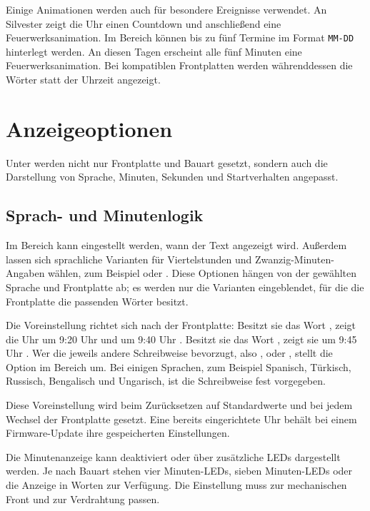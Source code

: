 \documentclass[12pt,a4paper, german,oneside, headinclude, headsepline,plainheadsepline,BCOR20mm, DIV18,parskip=half, openright, numbers=noenddot, captions=tableheading,version=first,listof=totoc,version=first]{scrbook}
\begin{document}
Einige Animationen werden auch für besondere Ereignisse verwendet. An Silvester zeigt die Uhr einen Countdown und anschließend eine Feuerwerksanimation. Im Bereich  können bis zu fünf Termine im Format \texttt{MM-DD} hinterlegt werden. An diesen Tagen erscheint alle fünf Minuten eine Feuerwerksanimation. Bei kompatiblen Frontplatten werden währenddessen die Wörter  statt der Uhrzeit angezeigt.

\section{Anzeigeoptionen}

Unter  werden nicht nur Frontplatte und Bauart gesetzt, sondern auch die Darstellung von Sprache, Minuten, Sekunden und Startverhalten angepasst.

\subsection{Sprach- und Minutenlogik}

Im Bereich  kann eingestellt werden, wann der Text  angezeigt wird. Außerdem lassen sich sprachliche Varianten für Viertelstunden und Zwanzig-Minuten-Angaben wählen, zum Beispiel  oder . Diese Optionen hängen von der gewählten Sprache und Frontplatte ab; es werden nur die Varianten eingeblendet, für die die Frontplatte die passenden Wörter besitzt.

Die Voreinstellung richtet sich nach der Frontplatte: Besitzt sie das Wort , zeigt die Uhr um 9:20 Uhr  und um 9:40 Uhr . Besitzt sie das Wort , zeigt sie um 9:45 Uhr . Wer die jeweils andere Schreibweise bevorzugt, also ,  oder , stellt die Option im Bereich  um. Bei einigen Sprachen, zum Beispiel Spanisch, Türkisch, Russisch, Bengalisch und Ungarisch, ist die Schreibweise fest vorgegeben.

Diese Voreinstellung wird beim Zurücksetzen auf Standardwerte und bei jedem Wechsel der Frontplatte gesetzt. Eine bereits eingerichtete Uhr behält bei einem Firmware-Update ihre gespeicherten Einstellungen.

Die Minutenanzeige kann deaktiviert oder über zusätzliche LEDs dargestellt werden. Je nach Bauart stehen vier Minuten-LEDs, sieben Minuten-LEDs oder die Anzeige in Worten zur Verfügung. Die Einstellung muss zur mechanischen Front und zur Verdrahtung passen.
\end{document}
